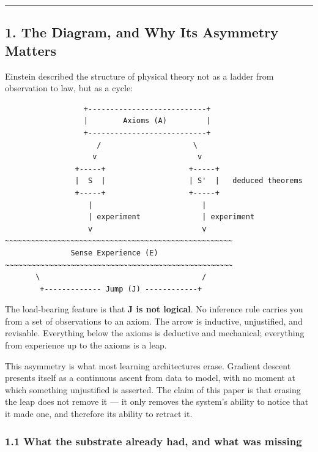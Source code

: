 \documentclass[
  11pt,
  a4paper,
]{article}
\begin{document}
\begin{center}\rule{0.5\linewidth}{0.5pt}\end{center}

\subsection{1. The Diagram, and Why Its Asymmetry
Matters}\label{the-diagram-and-why-its-asymmetry-matters}

Einstein described the structure of physical theory not as a ladder from
observation to law, but as a cycle:

\begin{verbatim}
                  +---------------------------+
                  |        Axioms (A)         |
                  +---------------------------+
                     /                     \
                    v                       v
                +-----+                   +-----+
                |  S  |                   | S'  |   deduced theorems
                +-----+                   +-----+
                   |                         |
                   | experiment              | experiment
                   v                         v
~~~~~~~~~~~~~~~~~~~~~~~~~~~~~~~~~~~~~~~~~~~~~~~~~~~~
               Sense Experience (E)
~~~~~~~~~~~~~~~~~~~~~~~~~~~~~~~~~~~~~~~~~~~~~~~~~~~~
       \                                     /
        +------------- Jump (J) ------------+
\end{verbatim}

The load-bearing feature is that \textbf{J is not logical}. No inference
rule carries you from a set of observations to an axiom. The arrow is
inductive, unjustified, and revisable. Everything below the axioms is
deductive and mechanical; everything from experience up to the axioms is
a leap.

This asymmetry is what most learning architectures erase. Gradient
descent presents itself as a continuous ascent from data to model, with
no moment at which something unjustified is asserted. The claim of this
paper is that erasing the leap does not remove it --- it only removes
the system's ability to notice that it made one, and therefore its
ability to retract it.

\subsubsection{1.1 What the substrate already had, and what was
missing}\label{what-the-substrate-already-had-and-what-was-missing}
\end{document}

